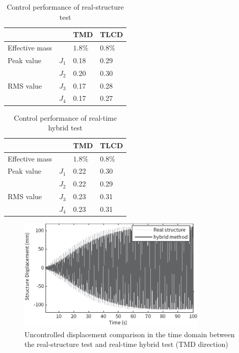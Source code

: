 \begin{table}[ht]
\centering
\begin{tabularx}{\textwidth}{@{}XXXX@{}}
\toprule[1pt]\midrule[0.3pt]
&& TMD & TLCD\\ \hline
Effective mass && $1.8\%$ & $0.8\%$\\
Peak value & $J_{1}$ & 0.18 & 0.29\\
& $J_{2}$ & 0.20 & 0.30\\
RMS value & $J_{3}$ & 0.17 & 0.28\\
& $J_{4}$ & 0.17 & 0.27\\
\bottomrule
\end{tabularx}
\caption{Control performance of real-structure test}
\label{tab:5-4}
\end{table}

\begin{table}[ht]
\centering
\begin{tabularx}{\textwidth}{@{}XXXX@{}}
\toprule[1pt]\midrule[0.3pt]
&& TMD & TLCD\\ \hline
Effective mass && $1.8\%$ & $0.8\%$\\
Peak value & $J_{1}$ & 0.22 & 0.30\\
& $J_{2}$ & 0.22 & 0.29\\
RMS value & $J_{3}$ & 0.23 & 0.31\\
& $J_{4}$ & 0.23 & 0.31\\
\bottomrule
\end{tabularx}
\caption{Control performance of real-time hybrid test}
\label{tab:5-5}
\end{table}

\begin{figure}[ht]
\centering
\includegraphics[width=0.8\textwidth] {figure/5-25.eps}
\caption{Uncontrolled displacement comparison in the time domain between the real-structure test and real-time hybrid test (TMD direction)}
\label{fig:5-25}
\end{figure}

